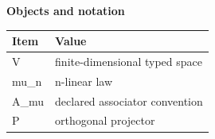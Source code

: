 \begin{center}
\textbf{Objects and notation}\par\smallskip
\begin{tabular}{ll}
\toprule
Item & Value \\
\midrule
V & finite-dimensional typed space \\
mu\_n & n-linear law \\
A\_mu & declared associator convention \\
P & orthogonal projector \\
\bottomrule
\end{tabular}
\end{center}
